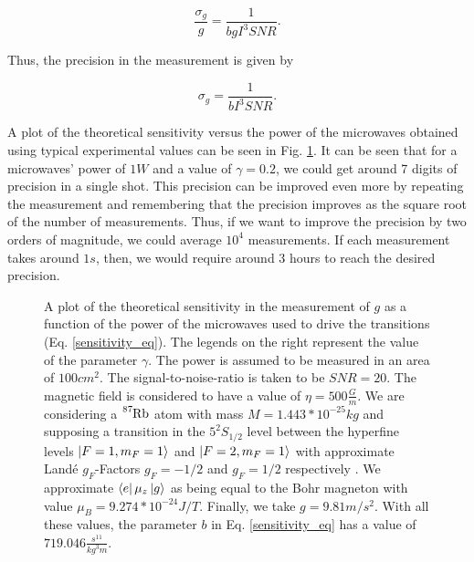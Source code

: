 \documentclass{article}
\begin{document}
\begin{equation}\label{sensitivity_eq}
    \frac{\sigma_{g}}{g} = \frac{1}{b g I^3 SNR}.
\end{equation}

Thus, the precision in the measurement is given by

\begin{equation}\label{precision_eq}
    \sigma_{g} = \frac{1}{b I^3 SNR}.
\end{equation}

A plot of the theoretical sensitivity versus the power of the microwaves obtained using typical experimental values can be seen in Fig. \ref{precision_vs_power_figure}. It can be seen that for a microwaves' power of $1W$ and a value of $\gamma=0.2$, we could get around 7 digits of precision in a single shot. This precision can be improved even more by repeating the measurement and remembering that the precision improves as the square root of the number of measurements\cite{Bevington_Robinson_Blair_Mallinckrodt_McKay_1993}. Thus, if we want to improve the precision by two orders of magnitude, we could average $10^{4}$ measurements. If each measurement takes around $1s$, then, we would require around $3$ hours to reach the desired precision.

\begin{figure}
    \centering
    
    \caption{A plot of the theoretical sensitivity in the measurement of $g$ as a function of the power of the microwaves used to drive the transitions (Eq. \ref{sensitivity_eq}). The legends on the right represent the value of the parameter $\gamma$. The power is assumed to be measured in an area of $100cm^2$. The signal-to-noise-ratio is taken to be $SNR=20$. The magnetic field is considered to have a value of $\eta = 500 \frac{G}{m}$. We are considering a $\ce{^{87}_{}Rb}$ atom with mass $M=1.443*10^{-25}kg$ and supposing a transition in the $5^{2}S_{1/2}$ level between the hyperfine levels $\ket{F=1, m_{F}=1}$ and $\ket{F=2, m_{F}=1}$ with approximate Landé $g_{F}$-Factors $g_{F}=-1/2$ and $g_{F}=1/2$ respectively \cite{Steck2010}. We approximate $\bra{e} \mu_{z} \ket{g}$ as being equal to the Bohr magneton with value $\mu_{B}=9.274*10^{-24}J/T$. Finally, we take $g=9.81 m/s^2$. With all these values, the parameter $b$ in Eq. \ref{sensitivity_eq} has a value of $719.046 \frac{s^{11}}{kg^{3}m}$.}
    \label{precision_vs_power_figure}
\end{figure}
\end{document}
